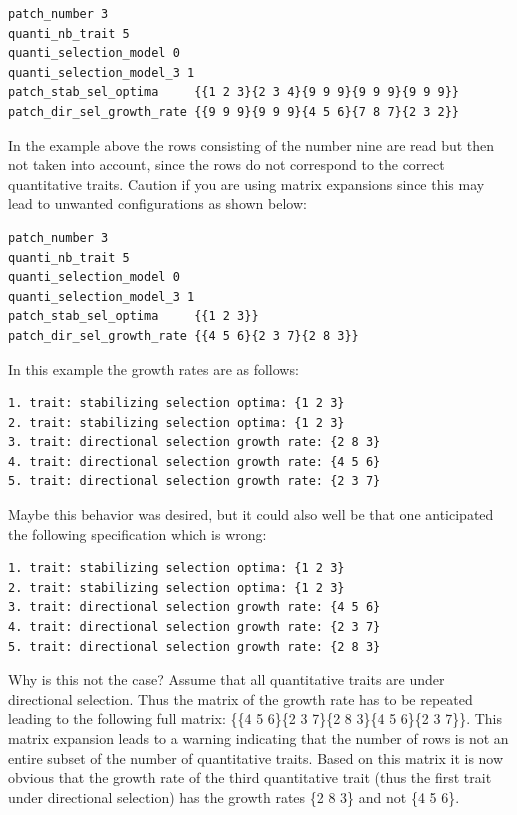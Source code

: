 \documentclass[letterpaper,12pt,oneside]{book}
\begin{document}
\begin{appendices}
\begin{lstlisting}[frame=single]
patch_number 3
quanti_nb_trait 5 
quanti_selection_model 0    
quanti_selection_model_3 1
patch_stab_sel_optima     {{1 2 3}{2 3 4}{9 9 9}{9 9 9}{9 9 9}}
patch_dir_sel_growth_rate {{9 9 9}{9 9 9}{4 5 6}{7 8 7}{2 3 2}}
\end{lstlisting}
In the example above the rows consisting of the number nine are read but then not taken into account, since the rows do not correspond to the correct quantitative traits. Caution if you are using matrix expansions since this may lead to unwanted configurations as shown below:
\begin{lstlisting}[frame=single]
patch_number 3
quanti_nb_trait 5 
quanti_selection_model 0    
quanti_selection_model_3 1
patch_stab_sel_optima     {{1 2 3}}
patch_dir_sel_growth_rate {{4 5 6}{2 3 7}{2 8 3}}
\end{lstlisting}
In this example the growth rates are as follows:
\begin{lstlisting}[frame=single]
1. trait: stabilizing selection optima: {1 2 3}
2. trait: stabilizing selection optima: {1 2 3}
3. trait: directional selection growth rate: {2 8 3}
4. trait: directional selection growth rate: {4 5 6}
5. trait: directional selection growth rate: {2 3 7}
\end{lstlisting}
Maybe this behavior was desired, but it could also well be that one anticipated the following specification which is wrong:
\begin{lstlisting}[frame=single]
1. trait: stabilizing selection optima: {1 2 3}
2. trait: stabilizing selection optima: {1 2 3}
3. trait: directional selection growth rate: {4 5 6}
4. trait: directional selection growth rate: {2 3 7}
5. trait: directional selection growth rate: {2 8 3}
\end{lstlisting}
Why is this not the case? Assume that all quantitative traits are under directional selection. Thus the matrix of the growth rate has to be repeated leading to the following full matrix: \{\{4 5 6\}\{2 3 7\}\{2 8 3\}\{4 5 6\}\{2 3 7\}\}. This matrix expansion leads to a warning indicating that the number of rows is not an entire subset of the number of quantitative traits. Based on this matrix it is now obvious that the growth rate of the third quantitative trait (thus the first trait under directional selection) has the growth rates \{2 8 3\} and not \{4 5 6\}.


\end{appendices}
\end{document}
